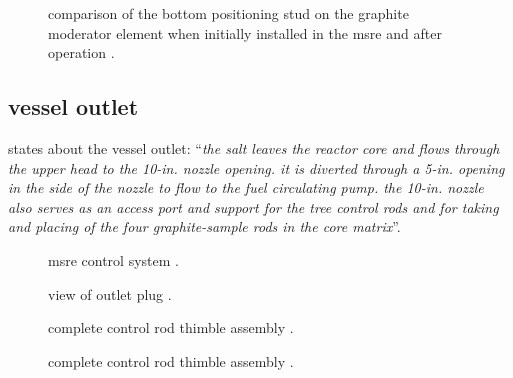 \documentclass{article}
\newcommand*{\mrsarchive}{../../msr-archive}%
\begin{document}
\begin{figure}[H]
  \centering
  \centering
  \caption{comparison of the bottom positioning stud on the graphite moderator element when initially installed in the msre and after operation \parencite[figure 13.3]{ornl-4676}.}
  \label{4676-fig13-3}
\end{figure}



\subsection{vessel outlet}
\parencite[page 84-85]{ornl-tm-0728} states about the vessel outlet:
\enquote{\textit{the salt leaves the reactor core and flows through the upper head to the 10-in. nozzle opening. it is diverted through a 5-in. opening in the side of the nozzle to flow to the fuel circulating pump. the 10-in. nozzle also serves as an access port and support for the tree control rods and for taking and placing of the four graphite-sample rods in the core matrix}}.

\begin{figure}[H]
  \centering
  \caption{msre control system \parencite[figure 14c]{ad-cf-61-2-46}.}
  \label{61246-fig14c}
\end{figure}

\begin{figure}[H]
  \centering
  \centering
  \caption{view of outlet plug \parencite[figure 1.2]{ornl-4676}.}
  \label{4676-fig1-2}
\end{figure}

\begin{figure}[H]
  \centering
  \caption{complete control rod thimble assembly \parencite[figure 43]{ornl-3708}.}
\end{figure}

\begin{figure}[H]
  \centering
  \caption{complete control rod thimble assembly \parencite[figure 44]{ornl-3708}.}
\end{figure}
\end{document}

